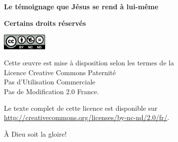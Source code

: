 \newpage
\mbox{}
\vfill

{\scriptsize

{\bfseries Le témoignage que Jésus se rend à lui-même}

{\bfseries Certains droits réservés}

\ifluatex
  \includegraphics[width=6em]{by-nc-nd_eu}
\fi

Cette \oe{}uvre est mise à disposition selon les termes de la \\
 Licence Creative Commons Paternité \\
 \ocadr Pas d'Utilisation Commerciale \\
 \ocadr Pas de Modification 2.0 France.

Le texte complet de cette licence est disponible sur \\
 \url{http://creativecommons.org/licenses/by-nc-nd/2.0/fr/}.

À Dieu soit la gloire!

}
\enlargethispage{\footskip}
\pagebreak


